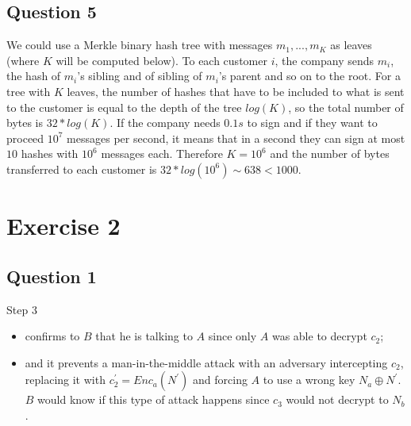 \documentclass{article}
\begin{document}
\subsection{Question 5}
We could use a Merkle binary hash tree with messages $m_{1}, ..., m_{K}$ as leaves (where $K$ will be computed below). To each customer $i$, the company sends $m_{i}$, the hash of $m_{i}$'s sibling and of sibling of $m_{i}$'s parent and so on to the root. For a tree with $K$ leaves, the number of hashes that have to be included to what is sent to the customer is equal to the depth of the tree $log(K)$, so the total number of bytes is $32 * log(K)$. If the company needs $0.1s$ to sign and if they want to proceed $10^{7}$ messages per second, it means that in a second they can sign at most $10$ hashes with $10^{6}$ messages each. Therefore $K=10^{6}$ and the number of bytes transferred to each customer is $32 * log(10^{6})\sim 638 < 1000$.   


\section{Exercise 2}

\subsection{Question 1}
Step 3
\begin{itemize}
	\item confirms to $B$ that he is talking to $A$ since only $A$ was able to decrypt $c_{2}$;
	\item and it prevents a man-in-the-middle attack with an adversary intercepting $c_{2}$, replacing it with $c_{2}^{'}=Enc_{a}(N^{'})$ and forcing $A$ to use a wrong key $N_{a}\oplus N^{'}$. $B$  would know if this type of attack happens since $c_{3}$ would not decrypt to $N_{b}$.  
\end{itemize}
\end{document}
